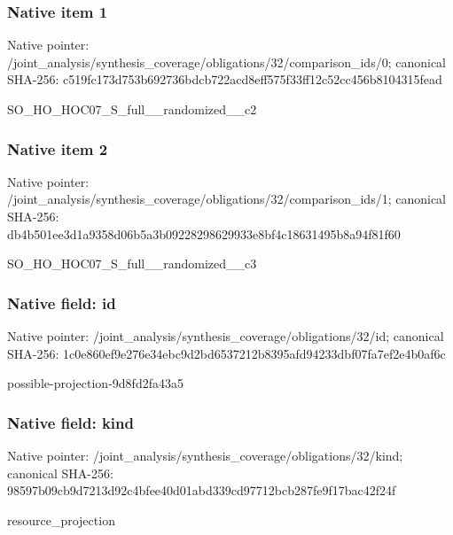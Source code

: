 \documentclass[10pt,a4paper]{article}
\begin{document}
\subsubsection{Native item 1}
Native pointer: /joint\_\allowbreak{}analysis/synthesis\_\allowbreak{}coverage/obligations/32/comparison\_\allowbreak{}ids/0; canonical SHA-256: c519fc173d753b692736bdcb722acd8eff575f33ff12c52cc456b8104315fead

\begingroup\raggedright\sloppy SO\_\allowbreak{}HO\_\allowbreak{}HOC07\_\allowbreak{}S\_\allowbreak{}full\_\allowbreak{}\_\allowbreak{}randomized\_\allowbreak{}\_\allowbreak{}c2\par\endgroup

\subsubsection{Native item 2}
Native pointer: /joint\_\allowbreak{}analysis/synthesis\_\allowbreak{}coverage/obligations/32/comparison\_\allowbreak{}ids/1; canonical SHA-256: db4b501ee3d1a9358d06b5a3b09228298629933e8bf4c18631495b8a94f81f60

\begingroup\raggedright\sloppy SO\_\allowbreak{}HO\_\allowbreak{}HOC07\_\allowbreak{}S\_\allowbreak{}full\_\allowbreak{}\_\allowbreak{}randomized\_\allowbreak{}\_\allowbreak{}c3\par\endgroup

\subsubsection{Native field: id}
Native pointer: /joint\_\allowbreak{}analysis/synthesis\_\allowbreak{}coverage/obligations/32/id; canonical SHA-256: 1c0e860ef9e276e34ebc9d2bd6537212b8395afd94233dbf07fa7ef2e4b0af6c

\begingroup\raggedright\sloppy possible-projection-9d8fd2fa43a5\par\endgroup

\subsubsection{Native field: kind}
Native pointer: /joint\_\allowbreak{}analysis/synthesis\_\allowbreak{}coverage/obligations/32/kind; canonical SHA-256: 98597b09cb9d7213d92c4bfee40d01abd339cd97712bcb287fe9f17bac42f24f

\begingroup\raggedright\sloppy resource\_\allowbreak{}projection\par\endgroup
\end{document}
